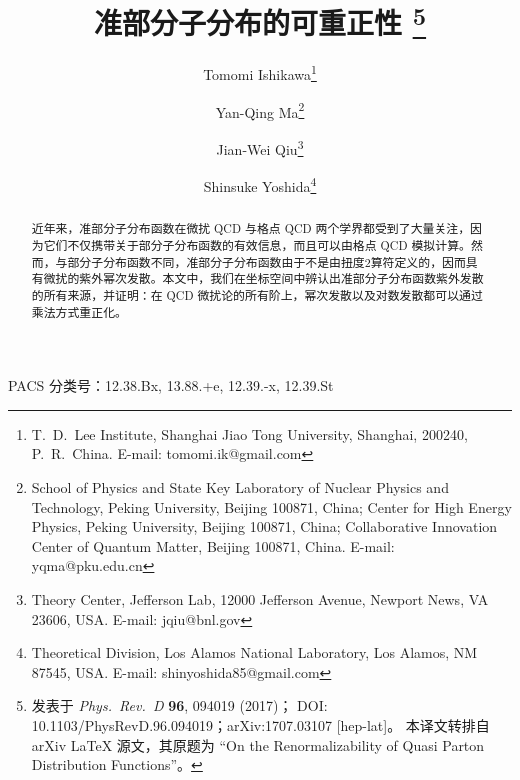 \documentclass[11pt]{ctexart}
\title{准部分子分布的可重正性%
\thanks{发表于 \emph{Phys.\ Rev.\ D} \textbf{96}, 094019 (2017)；
DOI: 10.1103/PhysRevD.96.094019；arXiv:1707.03107 [hep-lat]。
本译文转排自 arXiv LaTeX 源文，其原题为 ``On the Renormalizability
of Quasi Parton Distribution Functions''。}}
\author{Tomomi Ishikawa\thanks{T.~D.~Lee Institute, Shanghai Jiao Tong University,
Shanghai, 200240, P.~R.~China. E-mail: tomomi.ik@gmail.com}
\and Yan-Qing Ma\thanks{School of Physics and State Key Laboratory of Nuclear Physics and
Technology, Peking University, Beijing 100871, China; Center for High Energy Physics,
Peking University, Beijing 100871, China; Collaborative Innovation Center of Quantum Matter,
Beijing 100871, China. E-mail: yqma@pku.edu.cn}
\and Jian-Wei Qiu\thanks{Theory Center, Jefferson Lab, 12000 Jefferson Avenue,
Newport News, VA 23606, USA. E-mail: jqiu@bnl.gov}
\and Shinsuke Yoshida\thanks{Theoretical Division, Los Alamos National Laboratory,
Los Alamos, NM 87545, USA. E-mail: shinyoshida85@gmail.com}}
\date{}
\begin{document}
\maketitle

\begin{abstract}
近年来，准部分子分布函数在微扰 QCD 与格点 QCD 两个学界都受到了大量关注，因为它们不仅携带关于部分子分布函数的有效信息，而且可以由格点 QCD 模拟计算。然而，与部分子分布函数不同，准部分子分布函数由于不是由扭度2算符定义的，因而具有微扰的紫外幂次发散。本文中，我们在坐标空间中辨认出准部分子分布函数紫外发散的所有来源，并证明：在 QCD 微扰论的所有阶上，幂次发散以及对数发散都可以通过乘法方式重正化。
\end{abstract}

\noindent PACS 分类号：12.38.Bx, 13.88.+e, 12.39.-x, 12.39.St

\bigskip








\end{document}
